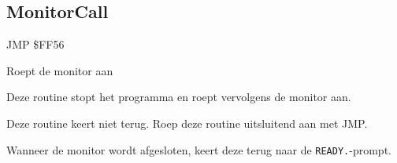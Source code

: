 
\newpage
\subsection{MonitorCall}
\label{KERNAL Jump Table!MonitorCall}
\begin{description}[leftmargin=2cm,style=nextline]
    \item [Adres:] JMP \$FF56    \item [Omschrijving:] Roept de monitor aan    \item [Opmerkingen:]        Deze routine stopt het programma en roept vervolgens de monitor aan.

        Deze routine keert niet terug. Roep deze routine uitsluitend aan met JMP.

        Wanneer de monitor wordt afgesloten, keert deze terug naar de \texttt{READY.}-prompt.    \item [Voorbeeld:]
\end{description}



\newpage
